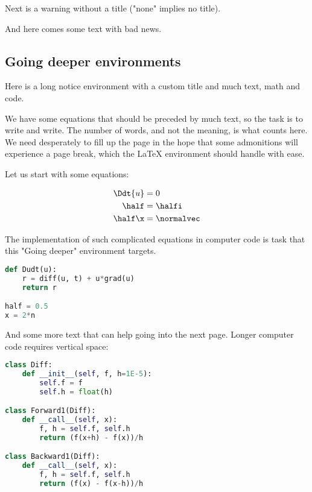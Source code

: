 \documentclass[%
oneside,                 %
final,                   %
10pt]{article}
\newenvironment{notice_mdfboxadmon}[1][]{
\begin{notice_mdfboxmdframed}[frametitle=#1]
}
{
\end{notice_mdfboxmdframed}
}
\newenvironment{warning_mdfboxadmon}[1][]{
\begin{warning_mdfboxmdframed}[frametitle=#1]
}
{
\end{warning_mdfboxmdframed}
}
\begin{document}
Next is a warning without a title ("none" implies no title).


\begin{warning_mdfboxadmon}[]
And here comes some text with bad news.
\end{warning_mdfboxadmon} %



\subsection{Going deeper environments}

Here is a long notice environment with a custom title and much
text, math and code.


\begin{notice_mdfboxadmon}
We have some equations that should be preceded by much text, so the
task is to write and write. The number of words, and not the
meaning, is what counts here. We need desperately to fill up the
page in the hope that some admonitions will experience a page break,
which the {\LaTeX} environment should handle with ease.

Let us start with some equations:

\begin{align*}
\Ddt{u} &= 0
\\
\half &= \halfi\\
\half\x &= \normalvec
\end{align*}

The implementation of such complicated equations in computer
code is task that this "Going deeper" environment targets.

\begin{lstlisting}[language=Python,style=simple,xleftmargin=2mm]
def Dudt(u):
    r = diff(u, t) + u*grad(u)
    return r

half = 0.5
x = 2*n
\end{lstlisting}
And some more text that can help going into the next page.
Longer computer code requires vertical space:

\begin{lstlisting}[language=Python,style=simple,xleftmargin=2mm]
class Diff:
    def __init__(self, f, h=1E-5):
        self.f = f
        self.h = float(h)

class Forward1(Diff):
    def __call__(self, x):
        f, h = self.f, self.h
        return (f(x+h) - f(x))/h

class Backward1(Diff):
    def __call__(self, x):
        f, h = self.f, self.h
        return (f(x) - f(x-h))/h


\end{lstlisting}
\end{notice_mdfboxadmon}
\end{document}
